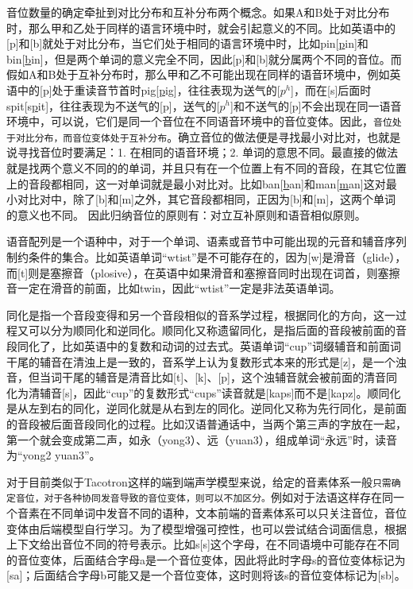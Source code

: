\documentclass[cn,10pt,math=newtx,citestyle=gb7714-2015,bibstyle=gb7714-2015]{elegantbook}
\begin{document}
音位数量的确定牵扯到对比分布和互补分布两个概念。如果A和B处于对比分布时，那么甲和乙处于同样的语言环境中时，就会引起意义的不同。比如英语中的[p]和[b]就处于对比分布，当它们处于相同的语言环境中时，比如pin[\underline{p}in]和bin[\underline{b}in]，但是两个单词的意义完全不同，因此[p]和[b]就分属两个不同的音位。而假如A和B处于互补分布时，那么甲和乙不可能出现在同样的语音环境中，例如英语中的[p]处于重读音节首时pig[\underline{p}ig]，往往表现为送气的[$p^h$]，而在[s]后面时spit[s\underline{p}it]，往往表现为不送气的[p]，送气的[$p^h$]和不送气的[p]不会出现在同一语音环境中，可以说，它们是同一个音位在不同语音环境中的音位变体。因此，\lstinline{音位处于对比分布，而音位变体处于互补分布}。确立音位的做法便是寻找最小对比对，也就是说寻找音位时要满足：1. 在相同的语音环境；2. 单词的意思不同。最直接的做法就是找两个意义不同的的单词，并且只有在一个位置上有不同的音段，在其它位置上的音段都相同，这一对单词就是最小对比对。比如ban[\underline{b}an]和man[\underline{m}an]这对最小对比对中，除了[b]和[m]之外，其它音段都相同，正因为[b]和[m]，这两个单词的意义也不同。 因此归纳音位的原则有：对立互补原则和语音相似原则。

语音配列是一个语种中，对于一个单词、语素或音节中可能出现的元音和辅音序列制约条件的集合。比如英语单词“wtist”是不可能存在的，因为[w]是滑音（glide），而[t]则是塞擦音（plosive），在英语中如果滑音和塞擦音同时出现在词首，则塞擦音一定在滑音的前面，比如twin，因此“wtist”一定是非法英语单词。

同化是指一个音段变得和另一个音段相似的音系学过程，根据同化的方向，这一过程又可以分为顺同化和逆同化。顺同化又称遗留同化，是指后面的音段被前面的音段同化了，比如英语中的复数和动词的过去式。英语单词“cup”词缀辅音和前面词干尾的辅音在清浊上是一致的，音系学上认为复数形式本来的形式是[z]，是一个浊音，但当词干尾的辅音是清音比如[t]、[k]、[p]，这个浊辅音就会被前面的清音同化为清辅音[s]，因此“cup”的复数形式“cups”读音就是[kaps]而不是[kapz]。顺同化是从左到右的同化，逆同化就是从右到左的同化。逆同化又称为先行同化，是前面的音段被后面音段同化的过程。比如汉语普通话中，当两个第三声的字放在一起，第一个就会变成第二声，如永（yong3）、远（yuan3），组成单词“永远”时，读音为“yong2 yuan3”。

对于目前类似于Tacotron这样的端到端声学模型来说，给定的音素体系一般\lstinline{只需确定音位，对于各种协同发音导致的音位变体，则可以不加区分。}例如对于法语这样存在同一个音素在不同单词中发音不同的语种，文本前端的音素体系可以只关注音位，音位变体由后端模型自行学习。为了模型增强可控性，也可以尝试结合词面信息，根据上下文给出音位不同的符号表示。比如s[s]这个字母，在不同语境中可能存在不同的音位变体，后面结合字母a是一个音位变体，因此将此时字母s的音位变体标记为[sa]；后面结合字母b可能又是一个音位变体，这时则将该s的音位变体标记为[sb]。
\end{document}
